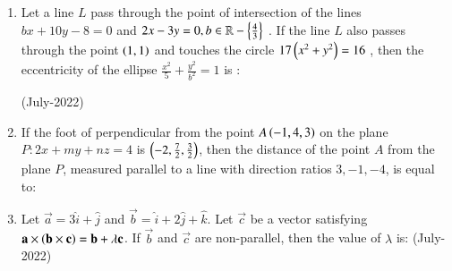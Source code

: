 \documentclass[journal]{IEEEtran}
\begin{document}
\begin{enumerate}
\begin{enumerate}
\end{enumerate}
\item Let a line $L$ pass through the point of intersection of the lines $bx + 10y - 8 = 0$ and  $2x - 3y = 0, b \in \mathbb{R} - \left\{\frac{4}{3}\right\}$
. If the line $L$
 also passes through the point $\left(1,1\right)$
 and touches the circle $17\left(x^2 + y^2\right) = 16$
, then the eccentricity of the ellipse $\frac{x^2}{5} + \frac{y^2}{b^2} = 1$ 
 is : 

 \hfill (July-2022)
 \begin{enumerate}
 \end{enumerate}
 \item If the foot of perpendicular from the point $A\left(-1,4,3\right)$ on the plane $P : 2x + my + nz = 4$ is $\left(-2, \frac{7}{2}, \frac{3}{2}\right)$, then the distance of the point $A$ from the plane $P$, measured parallel to a line with direction ratios $3, -1, -4$, is equal to:
 \begin{enumerate}
 \end{enumerate}
 \item Let $\vec{a} = 3\hat{i} + \hat{j}$ and $\vec{b} = \hat{i} + 2\hat{j} + \hat{k}$. Let $\vec{c}$ be a vector satisfying $\mathbf{a} \times \left(\mathbf{b} \times \mathbf{c}\right) = \mathbf{b} + \lambda \mathbf{c}$. If $\vec{b}$ and $\vec{c}$ are non-parallel, then the value of $\lambda$ is: \hfill (July-2022)
 \begin{enumerate}
\end{enumerate}
\end{enumerate}
\end{document}
